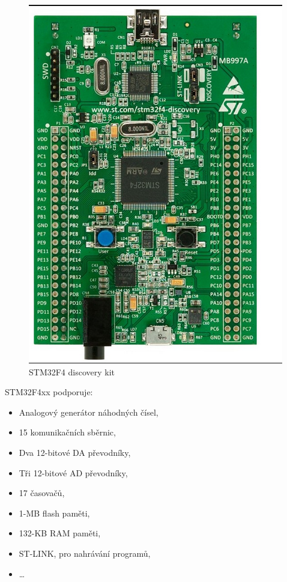 \documentclass[10pt]{article}
\begin{document}
\begin{figure}[h]
    \centering
    \includegraphics[scale=0.3]{kit.png}
    \caption{STM32F4 discovery kit}
    \label{fig:kit}
\end{figure}

\newpage

STM32F4xx podporuje:
\begin{itemize}
    \item Analogový generátor náhodných čísel,
    \item 15 komunikačních sběrnic,
    \item Dva 12-bitové DA převodníky,
    \item Tři 12-bitové AD převodníky,
    \item 17 časovačů,
    \item 1-MB flash paměti,
    \item 132-KB RAM paměti,
    \item ST-LINK, pro nahrávání programů,
    \item \ldots 
    
\end{itemize}
\end{document}
